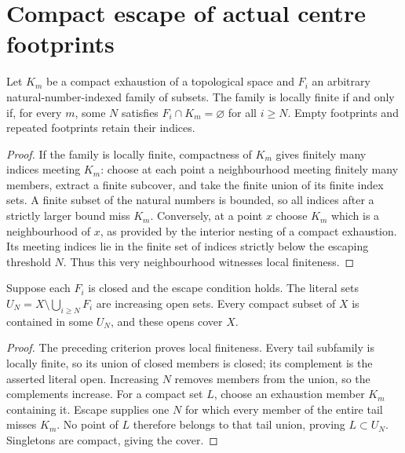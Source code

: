 \section{Compact escape of actual centre footprints}
\begin{theorem}
\label{hir:disjoint-compact-exhaustion-escape}
\leanok
Let $K_m$ be a compact exhaustion of a topological space and $F_i$ an arbitrary
natural-number-indexed family of subsets. The family is locally finite if
and only if, for every $m$, some $N$ satisfies $F_i\cap K_m=\varnothing$ for
all $i\ge N$. Empty footprints and repeated footprints retain their indices.
\end{theorem}
\begin{proof}
If the family is locally finite, compactness of $K_m$ gives finitely many
indices meeting $K_m$: choose at each point a neighbourhood meeting finitely
many members, extract a finite subcover, and take the finite union of its
finite index sets. A finite subset of the natural numbers is bounded, so
all indices after a strictly larger bound miss $K_m$. Conversely, at a point
$x$ choose $K_m$ which is a neighbourhood of $x$, as provided by the interior
nesting of a compact exhaustion. Its meeting indices lie in the finite set
of indices strictly below the escaping threshold $N$. Thus this very
neighbourhood witnesses local finiteness.
\end{proof}
\begin{theorem}
\label{hir:disjoint-compact-escape-protected-opens}
\leanok
Suppose each $F_i$ is closed and the escape condition holds. The literal
sets $U_N=X\setminus\bigcup_{i\ge N}F_i$ are increasing open sets. Every
compact subset of $X$ is contained in some $U_N$, and these opens cover $X$.
\end{theorem}
\begin{proof}
The preceding criterion proves local finiteness. Every tail subfamily is
locally finite, so its union of closed members is closed; its complement
is the asserted literal open. Increasing $N$ removes members from the union,
so the complements increase. For a compact set $L$, choose an exhaustion
member $K_m$ containing it. Escape supplies one $N$ for which every member
of the entire tail misses $K_m$. No point of $L$ therefore belongs to that
tail union, proving $L\subset U_N$. Singletons are compact, giving the cover.
\end{proof}
